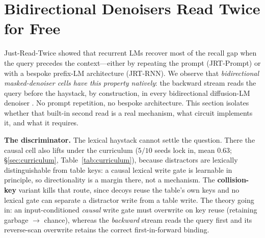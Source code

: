 \documentclass{article}
\begin{document}
\section{Bidirectional Denoisers Read Twice for Free}\label{sec:jrt}

Just-Read-Twice \citep{arora2024jrt} showed that recurrent LMs recover most of the recall gap when the query precedes the context---either by repeating the prompt (JRT-Prompt) or with a bespoke prefix-LM architecture (JRT-RNN). We observe that \emph{bidirectional masked-denoiser cells have this property natively}: the backward stream reads the query before the haystack, by construction, in every bidirectional diffusion-LM denoiser \citep{sahoo2024mdlm,singh2025diffumamba}. No prompt repetition, no bespoke architecture. This section isolates whether that built-in second read is a real mechanism, what circuit implements it, and what it requires.

\textbf{The discriminator.} The lexical haystack cannot settle the question. There the causal cell also lifts under the curriculum ($5/10$ seeds lock in, mean $0.63$; \S\ref{sec:curriculum}, Table~\ref{tab:curriculum}), because distractors are lexically distinguishable from table keys: a causal lexical write gate is learnable in principle, so directionality is a margin there, not a mechanism. The \textbf{collision-key} variant kills that route, since decoys reuse the table's own keys and no lexical gate can separate a distractor write from a table write. The theory going in: an input-conditioned \emph{causal} write gate must overwrite on key reuse (retaining garbage $\to$ chance), whereas the \emph{backward} stream reads the query first and its reverse-scan overwrite retains the correct first-in-forward binding.
\end{document}
